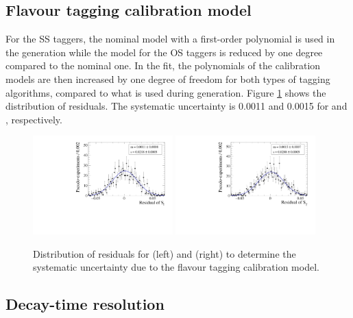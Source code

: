\subsection*{Flavour tagging calibration model}

For the SS taggers, the nominal model with a first-order polynomial is used in the generation while the model for the OS taggers is reduced by one degree compared to the nominal one.
In the fit, the polynomials of the calibration models are then increased by one degree of freedom for both types of tagging algorithms, compared to what is used during generation. Figure \ref{fig:systUncertFTmodel} shows the distribution of residuals. The systematic uncertainty is \num{0.0011} and \num{0.0015} for \Sf and \Sfbar, respectively.
\begin{figure}[tbp]
    \centering
    \includegraphics[width=0.48\textwidth]{10Systematics/figs/FT_Sf_res.pdf}
    \includegraphics[width=0.48\textwidth]{10Systematics/figs/FT_Sfbar_res.pdf}
    \caption{Distribution of residuals for \Sf (left) and \Sfbar (right) to determine the systematic uncertainty due to the flavour tagging calibration model.}
    \label{fig:systUncertFTmodel}
\end{figure}

\subsection*{Decay-time resolution}

